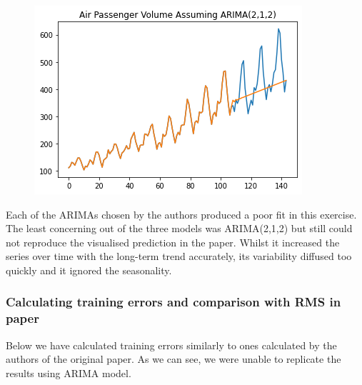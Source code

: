 \documentclass[
  letterpaper,
  DIV=11,
  numbers=noendperiod]{scrartcl}
\begin{document}
\begin{figure}[H]

{\centering \includegraphics{main_files/figure-pdf/cell-25-output-1.png}

}

\end{figure}

Each of the ARIMAs chosen by the authors produced a poor fit in this
exercise. The least concerning out of the three models was ARIMA(2,1,2)
but still could not reproduce the visualised prediction in the paper.
Whilst it increased the series over time with the long-term trend
accurately, its variability diffused too quickly and it ignored the
seasonality.

\hypertarget{calculating-training-errors-and-comparison-with-rms-in-paper}{%
\subsubsection{Calculating training errors and comparison with RMS in
paper}\label{calculating-training-errors-and-comparison-with-rms-in-paper}}

Below we have calculated training errors similarly to ones calculated by
the authors of the original paper. As we can see, we were unable to
replicate the results using ARIMA model.
\end{document}
